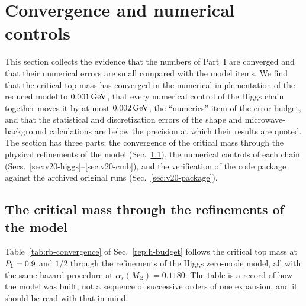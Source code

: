 
\section{Convergence and numerical controls}\label{rep:v-convergence}

This section collects the evidence that the numbers of Part~I are converged and that their numerical errors are small compared with the model items.
We find that the critical top mass has converged in the numerical implementation of the reduced model to $0.001\,\mathrm{GeV}$, that every numerical control of the Higgs chain together moves it by at most $0.002\,\mathrm{GeV}$, the ``numerics'' item of the error budget, and that the statistical and discretization errors of the shape and microwave-background calculations are below the precision at which their results are quoted. %
The section has three parts: the convergence of the critical mass through the physical refinements of the model (Sec.~\ref{sec:v20-refinements}), the numerical controls of each chain (Secs.~\ref{sec:v20-higgs}--\ref{sec:v20-cmb}), and the verification of the code package against the archived original runs (Sec.~\ref{sec:v20-package}).

\subsection{The critical mass through the refinements of the model}\label{sec:v20-refinements}

Table~\ref{tab:rb-convergence} of Sec.~\ref{rep:h-budget} follows the critical top mass at $P_1=0.9$ and $1/2$ through the refinements of the Higgs zero-mode model, all with the same hazard procedure at $\alpha_s(M_Z)=0.1180$. %
The table is a record of how the model was built, not a sequence of successive orders of one expansion, and it should be read with that in mind.


